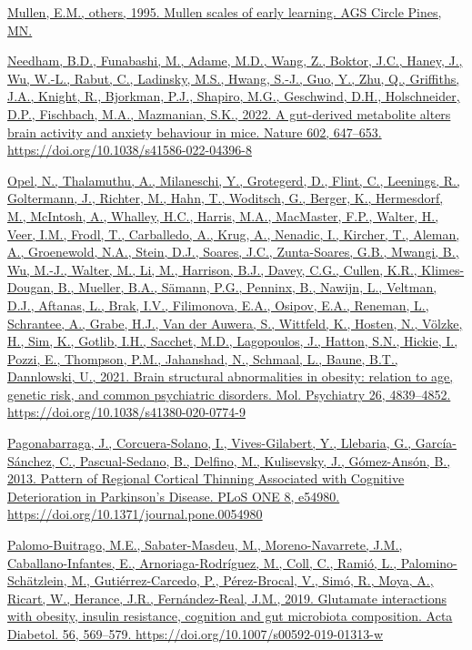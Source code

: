 \documentclass[
]{article}
\begin{document}
\href{https://www.zotero.org/google-docs/?uydJ8e}{Mullen, E.M., others,
1995. Mullen scales of early learning. AGS Circle Pines, MN.}

\href{https://www.zotero.org/google-docs/?uydJ8e}{Needham, B.D.,
Funabashi, M., Adame, M.D., Wang, Z., Boktor, J.C., Haney, J., Wu,
W.-L., Rabut, C., Ladinsky, M.S., Hwang, S.-J., Guo, Y., Zhu, Q.,
Griffiths, J.A., Knight, R., Bjorkman, P.J., Shapiro, M.G., Geschwind,
D.H., Holschneider, D.P., Fischbach, M.A., Mazmanian, S.K., 2022. A
gut-derived metabolite alters brain activity and anxiety behaviour in
mice. Nature 602, 647--653. https://doi.org/10.1038/s41586-022-04396-8}

\href{https://www.zotero.org/google-docs/?uydJ8e}{Opel, N., Thalamuthu,
A., Milaneschi, Y., Grotegerd, D., Flint, C., Leenings, R., Goltermann,
J., Richter, M., Hahn, T., Woditsch, G., Berger, K., Hermesdorf, M.,
McIntosh, A., Whalley, H.C., Harris, M.A., MacMaster, F.P., Walter, H.,
Veer, I.M., Frodl, T., Carballedo, A., Krug, A., Nenadic, I., Kircher,
T., Aleman, A., Groenewold, N.A., Stein, D.J., Soares, J.C.,
Zunta-Soares, G.B., Mwangi, B., Wu, M.-J., Walter, M., Li, M., Harrison,
B.J., Davey, C.G., Cullen, K.R., Klimes-Dougan, B., Mueller, B.A.,
Sämann, P.G., Penninx, B., Nawijn, L., Veltman, D.J., Aftanas, L., Brak,
I.V., Filimonova, E.A., Osipov, E.A., Reneman, L., Schrantee, A., Grabe,
H.J., Van der Auwera, S., Wittfeld, K., Hosten, N., Völzke, H., Sim, K.,
Gotlib, I.H., Sacchet, M.D., Lagopoulos, J., Hatton, S.N., Hickie, I.,
Pozzi, E., Thompson, P.M., Jahanshad, N., Schmaal, L., Baune, B.T.,
Dannlowski, U., 2021. Brain structural abnormalities in obesity:
relation to age, genetic risk, and common psychiatric disorders. Mol.
Psychiatry 26, 4839--4852. https://doi.org/10.1038/s41380-020-0774-9}

\href{https://www.zotero.org/google-docs/?uydJ8e}{Pagonabarraga, J.,
Corcuera-Solano, I., Vives-Gilabert, Y., Llebaria, G., García-Sánchez,
C., Pascual-Sedano, B., Delfino, M., Kulisevsky, J., Gómez-Ansón, B.,
2013. Pattern of Regional Cortical Thinning Associated with Cognitive
Deterioration in Parkinson's Disease. PLoS ONE 8, e54980.
https://doi.org/10.1371/journal.pone.0054980}

\href{https://www.zotero.org/google-docs/?uydJ8e}{Palomo-Buitrago, M.E.,
Sabater-Masdeu, M., Moreno-Navarrete, J.M., Caballano-Infantes, E.,
Arnoriaga-Rodríguez, M., Coll, C., Ramió, L., Palomino-Schätzlein, M.,
Gutiérrez-Carcedo, P., Pérez-Brocal, V., Simó, R., Moya, A., Ricart, W.,
Herance, J.R., Fernández-Real, J.M., 2019. Glutamate interactions with
obesity, insulin resistance, cognition and gut microbiota composition.
Acta Diabetol. 56, 569--579. https://doi.org/10.1007/s00592-019-01313-w}
\end{document}
